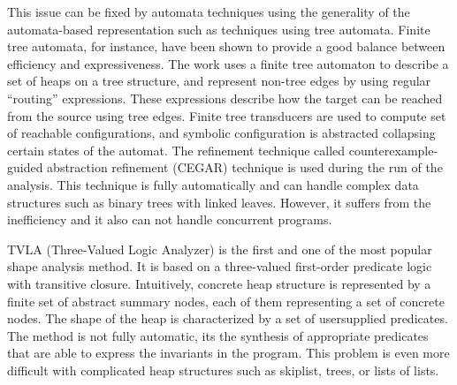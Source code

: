 This issue can be fixed by automata techniques using the generality of the automata-based representation such as techniques using tree automata. Finite tree automata, for instance, have been shown to provide a good balance between efficiency and expressiveness. The work \cite{Ahmed:TreeAutomata} uses a finite tree automaton to describe a set of heaps on a tree structure,
and represent non-tree edges by using regular “routing” expressions. These expressions
describe how the target can be reached from the source using tree edges. Finite tree transducers
are used to compute set of reachable configurations, and symbolic configuration is abstracted
collapsing certain states of the automat. The refinement technique called counterexample-guided
abstraction refinement (CEGAR) technique is used during the run of the analysis. This technique
is fully automatically and can handle complex data structures such as binary trees with linked
leaves. However, it suffers from the inefficiency and it also can not handle concurrent programs.

TVLA (Three-Valued Logic Analyzer) \cite{SagivRW02} is the first and one of the most popular shape analysis
method. It is based on a three-valued first-order predicate logic with transitive closure. Intuitively,
concrete heap structure is represented by a finite set of abstract summary nodes, each of them
representing a set of concrete nodes. The shape of the heap is characterized by a set of usersupplied
predicates. The method is not fully automatic, its the synthesis of appropriate predicates
that are able to express the invariants in the program. This problem is even more difficult with
complicated heap structures such as skiplist, trees, or lists of lists.  
  
